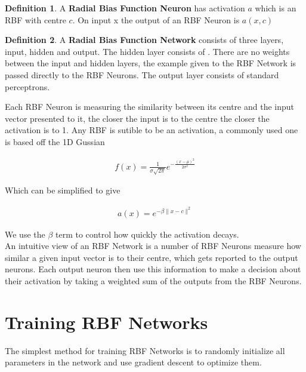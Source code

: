 \documentclass[notitlepage]{report}
\theoremstyle{definition}
\newtheorem{definition}{Definition}[section]
\begin{document}
\theoremstyle{definition}
\begin{definition}
	A \textbf{Radial Bias Function Neuron} has activation $a$ which is an RBF with centre $c$. On input x the output of an RBF Neuron is $a(x, c)$
\end{definition}

\theoremstyle{definition}
\begin{definition}
	A \textbf{Radial Bias Function Network} consists of three layers, input, hidden and output. The hidden layer consists of . There are no weights between the input and hidden layers, the example given to the RBF Network is passed directly to the RBF Neurons. The output layer consists of standard perceptrons.
\end{definition}

Each RBF Neuron is measuring the similarity between its centre and the input vector presented to it, the closer the input is to the centre the closer the activation is to 1. Any RBF is sutible to be an activation, a commonly used one is based off the 1D Gussian

\begin{align*}
f(x) = \frac{1}{\sigma \sqrt{2 \pi}} e^{-\frac{(x-\mu)^2}{2\sigma^2}}
\end{align*}

Which can be simplified to give

\begin{align}
a(x) = e^{-\beta \lVert x - c \lVert^2}
\end{align}

We use the $\beta$ term to control how quickly the activation decays.\\

An intuitive view of an RBF Network is a number of RBF Neurons measure how similar a given input vector is to their centre, which gets reported to the output neurons. Each output neuron then use this information to make a decision about their activation by taking a weighted sum of the outputs from the RBF Neurons.\\

\section{Training RBF Networks}
The simplest method for training RBF Networks is to randomly initialize all parameters in
 the network and use gradient descent to optimize them.
\end{document}
